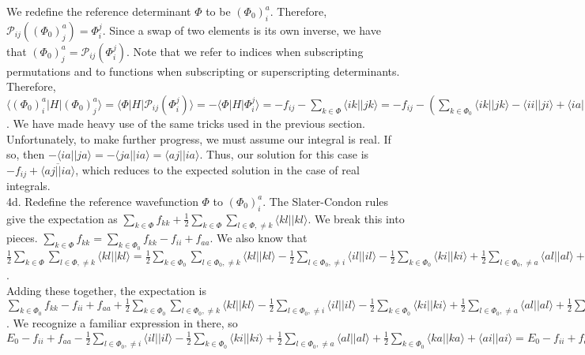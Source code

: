 \documentclass{article}
\begin{document}
We redefine the reference determinant $\Phi$ to be $(\Phi_0)_i^a$. Therefore,\\ $\mathcal{P}_{ij}((\Phi_0)_j^a)=\Phi_i^j$. Since a swap of two elements is its own inverse, we have that $(\Phi_0)_j^a = \mathcal{P}_{ij}(\Phi_i^j)$. Note that we refer to indices when subscripting permutations and to functions when subscripting or superscripting determinants. Therefore, $\langle (\Phi_0)_i^a | H | (\Phi_0)_j^a \rangle = \langle \Phi | H | \mathcal{P}_{ij}(\Phi_i^j) \rangle = - \langle \Phi | H | \Phi_i^j \rangle = - f_{ij} - \sum\limits_{k \in \Phi} \langle ik || jk \rangle = - f_{ij} - (\sum\limits_{k \in \Phi_0} \langle ik || jk \rangle - \langle ii || ji \rangle + \langle ia || ja \rangle) = - h_{ij} - \langle ia || ja \rangle$. We have made heavy use of the same tricks used in the previous section. Unfortunately, to make further progress, we must assume our integral is real. If so, then $ - \langle ia || ja \rangle = - \langle ja || ia \rangle = \langle aj || ia \rangle$. Thus, our solution for this case is $-f_{ij} + \overline{\langle aj || ia \rangle}$, which reduces to the expected solution in the case of real integrals.\\
4d. Redefine the reference wavefunction $\Phi$ to $(\Phi_0)_i^a$. The Slater-Condon rules give the expectation as $\sum\limits_{k \in \Phi} f_{kk} + \frac{1}{2} \sum\limits_{k \in \Phi} \sum\limits_{l \in \Phi, \neq k} \langle kl || kl \rangle$. We break this into pieces. $\sum\limits_{k \in \Phi} f_{kk} = \sum\limits_{k \in \Phi_0} f_{kk} - f_{ii} + f_{aa}$. We also know that $\frac{1}{2} \sum\limits_{k \in \Phi} \sum\limits_{l \in \Phi, \neq k} \langle kl || kl \rangle = \frac{1}{2} \sum\limits_{k \in \Phi_0} \sum\limits_{l \in \Phi_0, \neq k} \langle kl || kl \rangle - \frac{1}{2} \sum\limits_{l \in \Phi_0, \neq i} \langle il || il \rangle - \frac{1}{2} \sum\limits_{k \in \Phi_0} \langle ki || ki \rangle
+ \frac{1}{2} \sum\limits_{l \in \Phi_0, \neq a} \langle al || al \rangle + \frac{1}{2} \sum\limits_{k \in \Phi_0} \langle ka || ka \rangle + \langle ai || ai \rangle$.\\
Adding these together, the expectation is $\sum\limits_{k \in \Phi_0} f_{kk} - f_{ii} + f_{aa} + \frac{1}{2} \sum\limits_{k \in \Phi_0} \sum\limits_{l \in \Phi_0, \neq k} \langle kl || kl \rangle - \frac{1}{2} \sum\limits_{l \in \Phi_0, \neq i} \langle il || il \rangle - \frac{1}{2} \sum\limits_{k \in \Phi_0} \langle ki || ki \rangle
+ \frac{1}{2} \sum\limits_{l \in \Phi_0, \neq a} \langle al || al \rangle + \frac{1}{2} \sum\limits_{k \in \Phi_0} \langle ka || ka \rangle + \langle ai || ai \rangle$. We recognize a familiar expression in there, so $E_0 - f_{ii} + f_{aa} - \frac{1}{2} \sum\limits_{l \in \Phi_0, \neq i} \langle il || il \rangle - \frac{1}{2} \sum\limits_{k \in \Phi_0} \langle ki || ki \rangle
+ \frac{1}{2} \sum\limits_{l \in \Phi_0, \neq a} \langle al || al \rangle + \frac{1}{2} \sum\limits_{k \in \Phi_0} \langle ka || ka \rangle + \langle ai || ai \rangle =
E_0 - f_{ii} + f_{aa} - \sum\limits_{l \in \Phi_0} \langle il || il \rangle
+ \sum\limits_{l \in \Phi_0} \langle al || al \rangle = E_0 - f_{ii} + f_{aa} + \langle ai || ai \rangle$
\end{document}
